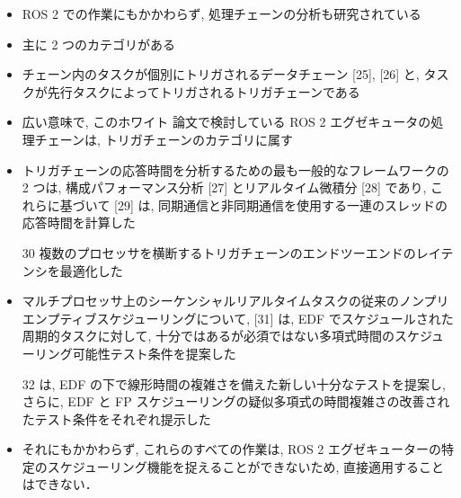 \begin{frame}{}
    \begin{itemize}
        \item ROS 2 での作業にもかかわらず, 処理チェーンの分析も研究されている
\item 主に 2 つのカテゴリがある
\item チェーン内のタスクが個別にトリガされるデータチェーン [25], [26] と, タスクが先行タスクによってトリガされるトリガチェーンである
\item 広い意味で, このホワイト 論文で検討している ROS 2 エグゼキュータの処理チェーンは, トリガチェーンのカテゴリに属す
\item トリガチェーンの応答時間を分析するための最も一般的なフレームワークの 2 つは, 構成パフォーマンス分析 [27] とリアルタイム微積分 [28] であり, これらに基づいて [29] は, 同期通信と非同期通信を使用する一連のスレッドの応答時間を計算した
\item [30] 複数のプロセッサを横断するトリガチェーンのエンドツーエンドのレイテンシを最適化した
\item マルチプロセッサ上のシーケンシャルリアルタイムタスクの従来のノンプリエンプティブスケジューリングについて, [31] は, EDF でスケジュールされた周期的タスクに対して, 十分ではあるが必須ではない多項式時間のスケジューリング可能性テスト条件を提案した
\item [32] は, EDF の下で線形時間の複雑さを備えた新しい十分なテストを提案し, さらに, EDF と FP スケジューリングの疑似多項式の時間複雑さの改善されたテスト条件をそれぞれ提示した
\item それにもかかわらず, これらのすべての作業は, ROS 2 エグゼキューターの特定のスケジューリング機能を捉えることができないため, 直接適用することはできない．
    \end{itemize}
\end{frame}
